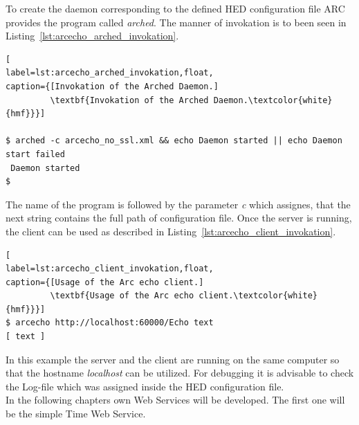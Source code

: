 To create the daemon corresponding to the defined HED configuration file ARC provides the program called \textit{arched}.
The manner of invokation is to been seen in Listing~\ref{lst:arcecho_arched_invokation}.
\begin{lstlisting}[
label=lst:arcecho_arched_invokation,float,
caption={[Invokation of the Arched Daemon.]
         \textbf{Invokation of the Arched Daemon.\textcolor{white}{hmf}}}]

$ arched -c arcecho_no_ssl.xml && echo Daemon started || echo Daemon start failed
 Daemon started
$
\end{lstlisting}

%
%
The name of the program is followed by the parameter \textit{c} which assignes, that the next string contains the full path of configuration file. Once the server is running, the client can be used as described in Listing~\ref{lst:arcecho_client_invokation}.
\begin{lstlisting}[
label=lst:arcecho_client_invokation,float,
caption={[Usage of the Arc echo client.]
         \textbf{Usage of the Arc echo client.\textcolor{white}{hmf}}}]
$ arcecho http://localhost:60000/Echo text
[ text ]
\end{lstlisting}

In this example the server and the client are running on the same computer so that the hostname \textit{localhost} can be utilized. 
For debugging it is advisable to check the Log-file which was assigned inside the HED configuration file.\\


In the following chapters own Web Services will be developed. The first one will be the simple Time Web Service.












